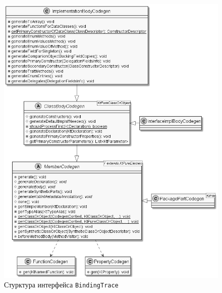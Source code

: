 \begin{figure}[htbp]
    \centering
    \includegraphics[width=\textwidth]{resources/06/06_member_codegen.png}
    \caption{Стурктура интерфейса \lstinline{BindingTrace}}
    \label{fig05:binding-trace-scheme}
\end{figure}

